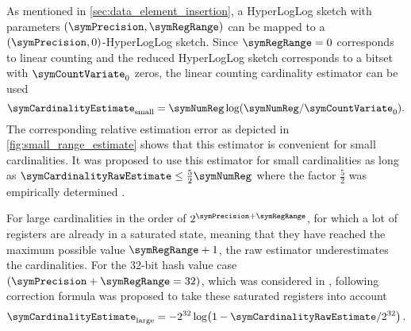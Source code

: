\documentclass[a4paper]{scrartcl}
\begin{document}
As mentioned in \cref{sec:data_element_insertion}, a HyperLogLog sketch with parameters $(\symPrecision, \symRegRange)$ can be mapped to a $(\symPrecision, 0)$-HyperLogLog sketch. Since $\symRegRange=0$ corresponds to linear counting and the reduced HyperLogLog sketch corresponds to a bitset with $\symCountVariate_0$ zeros, the linear counting cardinality estimator \cite{Whang1990} can be used
\begin{equation}
\label{equ:linear_counting_estimator}
\symCardinalityEstimate_\text{small} = \symNumReg \log(\symNumReg/\symCountVariate_0).
\end{equation}
The corresponding relative estimation error as depicted in \cref{fig:small_range_estimate} shows that this estimator is convenient for small cardinalities. It was proposed to use this estimator for small cardinalities as long as $\symCardinalityRawEstimate \leq \frac{5}{2}\symNumReg$ where the factor $\frac{5}{2}$ was empirically determined \cite{Flajolet2007}. 

For large cardinalities in the order of $2^{\symPrecision+\symRegRange}$, for which a lot of registers are already in a saturated state, meaning that they have reached the maximum possible value $\symRegRange + 1$, the raw estimator underestimates the cardinalities. For the 32-bit hash value case $(\symPrecision+\symRegRange=32)$, which was considered in \cite{Flajolet2007}, following correction formula was proposed to take these saturated registers into account
\begin{equation}
\label{equ:large_range_estimate}
\symCardinalityEstimate_\text{large}
=
-2^{32}\log\!\left(1-\symCardinalityRawEstimate/2^{32}\right).
\end{equation}
\end{document}
